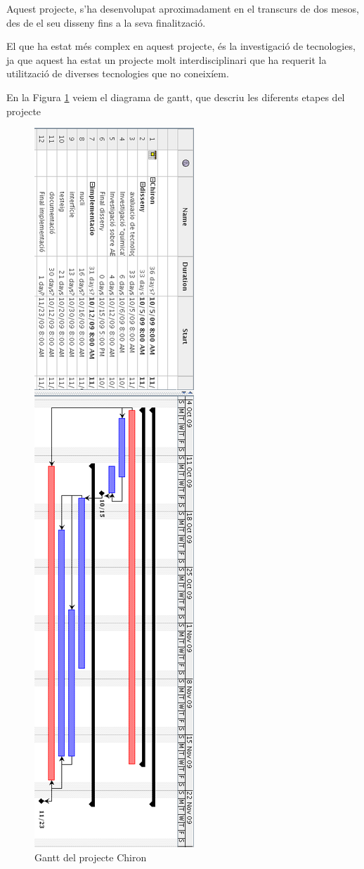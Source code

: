 Aquest projecte, s'ha desenvolupat aproximadament en el transcurs de dos mesos,
des de el seu disseny fins a la seva finalització.  

El que ha estat més complex en aquest projecte, és la investigació de
tecnologies, ja que aquest ha estat un projecte molt interdisciplinari que ha
requerit la utilització de diverses tecnologies que no coneixíem.

En la Figura \ref{fig:chiron-gantt} veiem el diagrama de gantt, que descriu les
diferents etapes del projecte 

\begin{figure}[h]
	\begin{center}
		\includegraphics[scale=0.5]{chiron/chiron-gantt.png}
	\end{center}
	\caption{Gantt del projecte Chiron}
	\label{fig:chiron-gantt}
\end{figure}

